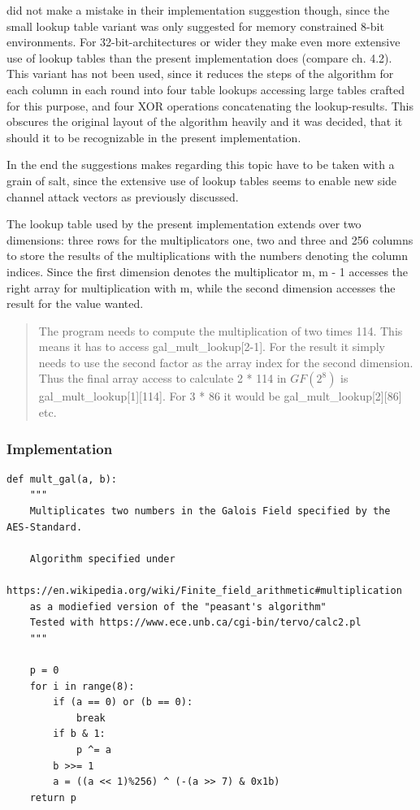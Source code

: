 \cite{rijndael} did not
make a mistake in their implementation suggestion though, since the
small lookup table variant was only suggested for memory constrained
8-bit environments. For 32-bit-architectures or wider they make even more
extensive use of lookup tables than the present implementation does
(compare ch. 4.2). This variant has not been used, since it reduces the
steps of the algorithm for each column in each round into four table
lookups accessing large tables crafted for this purpose, and four XOR
operations concatenating the lookup-results. This obscures the original
layout of the algorithm heavily and it was decided, that it should it to be recognizable
in the present implementation.

In the end the suggestions \cite{rijndael} makes regarding this topic have to
be taken with a grain of salt, since the extensive use of lookup tables
seems to enable new side channel attack vectors as previously discussed.

The lookup table used by the present implementation extends over two
dimensions: three rows for the multiplicators one, two and three and 256
columns to store the results of the multiplications with the numbers
denoting the column indices. Since the first dimension denotes the
multiplicator m, m - 1 accesses the right array for multiplication with
m, while the second dimension accesses the result for the value wanted.

\begin{quote}
The program needs to compute the multiplication of two times 114. This
means it has to access gal\_mult\_lookup[2-1]. For the result it
simply needs to use the second factor as the array index for the second
dimension. Thus the final array access to calculate 2 * 114 in $GF(2^{8})$ is
gal\_mult\_lookup[1][114]. For 3 * 86 it would be
gal\_mult\_lookup[2][86] etc.
\end{quote}

\hypertarget{implementation}{%
\subsubsection{Implementation}\label{implementation}}

\begin{lstlisting}
def mult_gal(a, b):
    """
    Multiplicates two numbers in the Galois Field specified by the AES-Standard.

    Algorithm specified under
    https://en.wikipedia.org/wiki/Finite_field_arithmetic#multiplication
    as a modiefied version of the "peasant's algorithm"
    Tested with https://www.ece.unb.ca/cgi-bin/tervo/calc2.pl
    """
    
    p = 0
    for i in range(8):
        if (a == 0) or (b == 0):
            break
        if b & 1:
            p ^= a
        b >>= 1
        a = ((a << 1)%256) ^ (-(a >> 7) & 0x1b)
    return p
\end{lstlisting}

